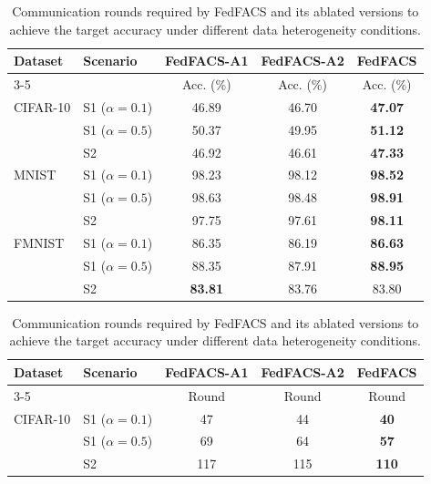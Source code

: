 \documentclass[pdflatex,sn-mathphys-num,oneside]{sn-jnl}%
\theoremstyle{thmstyleone}%
\theoremstyle{thmstyletwo}%
\theoremstyle{thmstylethree}%
\newlength{\journalfloatwidth}
\begin{document}
\begin{table}[!htbp]
\centering
\footnotesize
\setlength{\tabcolsep}{4pt}
\renewcommand{\arraystretch}{1.08}
\setlength{\abovecaptionskip}{2pt}
\setlength{\belowcaptionskip}{3pt}

\caption{Accuracy comparison of FedFACS and its ablated variants under different data heterogeneity conditions.}
\label{tab:ablation_accuracy}

\begin{tabular*}{\journalfloatwidth}{@{\extracolsep{\fill}}llccc@{}}
\toprule
Dataset & Scenario & FedFACS-A1 & FedFACS-A2 & FedFACS \\
\cmidrule(lr){3-5}
 &  & Acc. (\%) & Acc. (\%) & Acc. (\%) \\
\midrule
CIFAR-10 & S1 ($\alpha=0.1$) & 46.89 & 46.70 & \textbf{47.07} \\
         & S1 ($\alpha=0.5$) & 50.37 & 49.95 & \textbf{51.12} \\
         & S2                 & 46.92 & 46.61 & \textbf{47.33} \\

MNIST    & S1 ($\alpha=0.1$) & 98.23 & 98.12 & \textbf{98.52} \\
         & S1 ($\alpha=0.5$) & 98.63 & 98.48 & \textbf{98.91} \\
         & S2                 & 97.75 & 97.61 & \textbf{98.11} \\

FMNIST   & S1 ($\alpha=0.1$) & 86.35 & 86.19 & \textbf{86.63} \\
         & S1 ($\alpha=0.5$) & 88.35 & 87.91 & \textbf{88.95} \\
         & S2                 & \textbf{83.81} & 83.76 & 83.80 \\
\bottomrule
\end{tabular*}

\vspace{15pt}

\caption{Communication rounds required by FedFACS and its ablated versions to achieve the target accuracy under different data heterogeneity conditions.}
\label{tab:round_to_accuracy_ablation}

\begin{tabular*}{\journalfloatwidth}{@{\extracolsep{\fill}}llccc@{}}
\toprule
Dataset & Scenario & FedFACS-A1 & FedFACS-A2 & FedFACS \\
\cmidrule(lr){3-5}
 &  & Round & Round & Round \\
\midrule
CIFAR-10 & S1 ($\alpha=0.1$) & 47 & 44 & \textbf{40} \\
         & S1 ($\alpha=0.5$) & 69 & 64 & \textbf{57} \\
         & S2                 & 117 & 115 & \textbf{110} \\


\end{tabular*}
\end{table}
\end{document}
